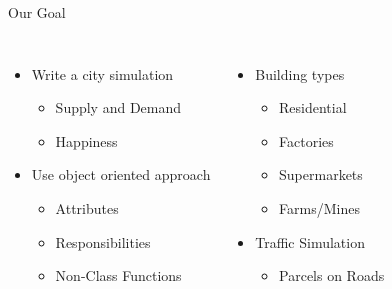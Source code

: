 
\begin{frame}[t,plain]
\titlepage
\end{frame}


\begin{frame}[fragile]{Our Goal}
%
\begin{columns}[T]
\begin{itemize}
\item Write a city simulation
	\begin{itemize}
	\item Supply and Demand
	\item Happiness
	\end{itemize}
\item Use object oriented approach
	\begin{itemize}
	\item Attributes
	\item Responsibilities
	\item Non-Class Functions
	\end{itemize}
\end{itemize}
%
\begin{itemize}
\item Building types
	\begin{itemize}
	\item Residential
	\item Factories
	\item Supermarkets
	\item Farms/Mines
	\end{itemize}
\item Traffic Simulation
	\begin{itemize}
	\item Parcels on Roads
	\end{itemize}
\end{itemize}
\end{columns}
%
\end{frame}



